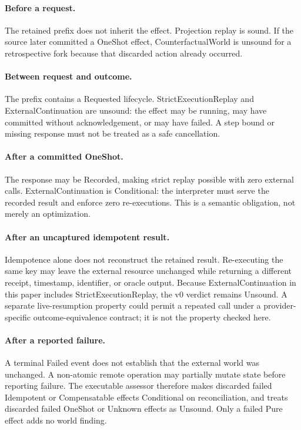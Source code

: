 \paragraph{Before a request.}
The retained prefix does not inherit the effect.  Projection replay is sound.
If the source later committed a OneShot effect, CounterfactualWorld is unsound
for a retrospective fork because that discarded action already occurred.

\paragraph{Between request and outcome.}
The prefix contains a Requested lifecycle.  StrictExecutionReplay and
ExternalContinuation are unsound: the effect may be running, may have committed
without acknowledgement, or may have failed.  A step bound or missing response
must not be treated as a safe cancellation.

\paragraph{After a committed OneShot.}
The response may be Recorded, making strict replay possible with zero external
calls.  ExternalContinuation is Conditional: the interpreter must serve the
recorded result and enforce zero re-executions.  This is a semantic obligation,
not merely an optimization.

\paragraph{After an uncaptured idempotent result.}
Idempotence alone does not reconstruct the retained result.  Re-executing the
same key may leave the external resource unchanged while returning a different
receipt, timestamp, identifier, or oracle output.  Because ExternalContinuation
in this paper includes StrictExecutionReplay, the v0 verdict remains Unsound.
A separate live-resumption property could permit a repeated call under a
provider-specific outcome-equivalence contract; it is not the property checked
here.

\paragraph{After a reported failure.}
A terminal Failed event does not establish that the external world was
unchanged.  A non-atomic remote operation may partially mutate state before
reporting failure.  The executable assessor therefore makes discarded failed
Idempotent or Compensatable effects Conditional on reconciliation, and treats
discarded failed OneShot or Unknown effects as Unsound.  Only a failed Pure
effect adds no world finding.

